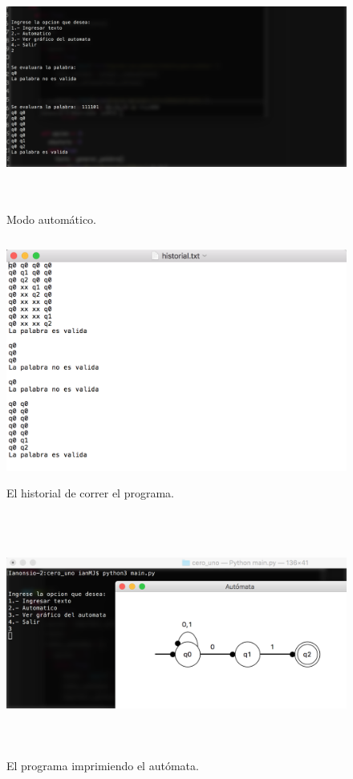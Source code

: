 \documentclass[12pt]{article}
\begin{document}
\begin{figure}[H]
\includegraphics[width=\textwidth, height=8cm]{cero_uno_auto}
\caption{Modo automático.}
\label{fig:automata_cero_uno_auto}
\end{figure}

\begin{figure}[H]
\includegraphics[width=\textwidth, height=8cm]{cero_uno_historial}
\caption{El historial de correr el programa.}
\label{fig:automata_cero_uno_historial}
\end{figure}

\begin{figure}[H]
\includegraphics[width=\textwidth, height=8cm]{automata_cero_uno_prueba}
\caption{El programa imprimiendo el autómata.}
\label{fig:automata_cero_uno_prueba}
\end{figure}
\end{document}
